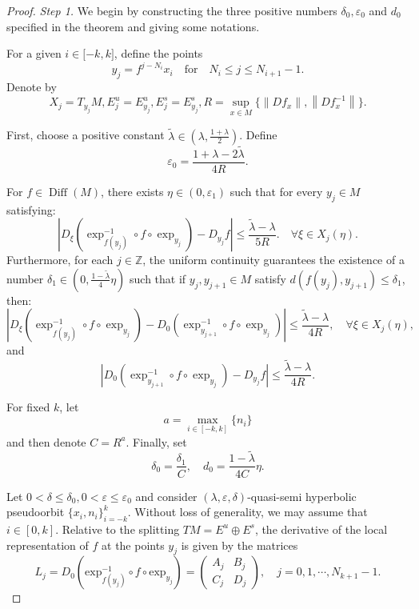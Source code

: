 \documentclass[12pt]{article}
\begin{document}
\begin{proof}
	{\em Step 1.} We begin by constructing the three positive numbers  $\delta_0, \varepsilon_0$ and $d_0$ specified in the theorem and giving some notations.
	
	For a given $ i\in\lbrack -k,k \rbrack $, define the points $$  y_{j}=f^{j-N_{i}}x_{i}\quad \text{for}\quad N_{i}\leqslant j\leqslant N_{i+1}-1 .$$
	Denote by $$ X_{j}=T_{y_{j}}M,E_{j}^{u}=E_{y_{j}}^{u},E_{j}^{s}=E_{y_{j}}^{s},R=\sup_{x\in M}\{\left\|Df_{x}\right\|,\left\|Df_{x}^{-1}\right\|\}. $$
	
	First, choose a positive constant $\widetilde{\lambda} \in (\lambda, \frac{1+\lambda}{2})$. Define $$\varepsilon_0 = \frac{1 + \lambda - 2\widetilde{\lambda}}{4R}. $$
	
	
	For $f \in \operatorname{Diff}(M)$, there exists $\eta\in(0,\varepsilon_1) $ such that for every $ y_j \in M $ satisfying:
	$$ |D_\xi(\exp_{f(y_{j})}^{-1} \circ f \circ \exp_{y_j}) - D_{y_j}f| \leqslant \frac{\widetilde{\lambda} - \lambda}{5R}.\quad \forall \xi \in X_{j}(\eta). $$
	Furthermore, for each $j \in \mathbb{Z}$, the uniform continuity guarantees the existence of a number $\delta_{1} \in (0, \frac{1-\widetilde{\lambda}}{4}\eta)$ such that if $y_j,y_{j+1} \in M$  satisfy $d(f(y_j), y_{j+1}) \leqslant \delta_{1}$, then:
	\begin{equation}\label{3.1}\left| D_\xi (\exp_{f(y_{j})}^{-1} \circ f \circ \exp_{y_j}) - D_0 (\exp_{y_{j+1}}^{-1} \circ f\circ \exp_{y_j}) \right| \leqslant \frac{\widetilde{\lambda} - \lambda}{4R}, \quad \forall \xi \in X_{j}(\eta),
	\end{equation}
	and
	\begin{equation}\label{3.2}\left| D_0 (\exp_{y_{j+1}}^{-1} \circ f \circ \exp_{y_j}) - D_{y_j} f\right| \leqslant \frac{\widetilde{\lambda} - \lambda}{4R}.
	\end{equation}
	
	For fixed $ k $, let $$ a=\max_{i\in [-k,k]}\{n_{i}\} $$ and then denote $ C=R^{a} $. Finally,  set  $$\delta_0 = \frac{\delta_{1} }{C},\quad d_0 = \frac{1-\widetilde{\lambda}}{4C}\eta .$$
	
	Let $ 0<\delta\leqslant\delta_0,0<\varepsilon\leqslant\varepsilon_0  $ and consider $ (\lambda,\varepsilon,\delta) $-quasi-semi hyperbolic pseudoorbit $ \{x_{i},n_{i}\}_{i=-k}^{k} $. Without loss of generality, we may assume that $ i\in [0,k] $. Relative to the splitting $ TM=E^{u} \oplus E^{s} $, the derivative of the local representation of $f$ at the points $  y_{j} $ is given by the matrices
	$$
	L_{j}=D_{0}(\text{exp}_{f(y_{j})}^{-1}\circ f\circ \text{exp}_{y_{j}})=
	\begin{pmatrix}
		A_{j}&B_{j}\\
		C_{j}&D_{j}
	\end{pmatrix},\quad j=0,1,\cdots,N_{k+1}-1.
	$$ 
	

\end{proof}
\end{document}
